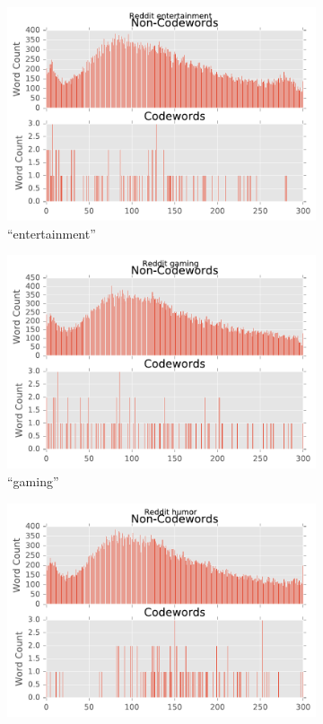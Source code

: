 \begin{figure}[H]
\begin{subfigure}[t]{.4\textwidth}
\centering\includegraphics[]{figures/reddit-entertainment-count.pdf}
\caption{``entertainment''}
\label{fig-reddit-entertainment-count}
\end{subfigure}
\begin{subfigure}[t]{.4\textwidth}
\centering\includegraphics[]{figures/reddit-gaming-count.pdf}
\caption{``gaming''}
\label{fig-reddit-gaming-count}
\end{subfigure}
\begin{subfigure}[t]{.4\textwidth}
\centering\includegraphics[]{figures/reddit-humor-count.pdf}

\end{subfigure}
\end{figure}
